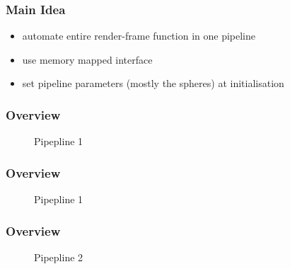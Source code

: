 \documentclass{beamer}
\begin{document}
\begin{frame} %
	\frametitle{Main Idea}
	\begin{itemize}
	\item automate entire render-frame function in one pipeline
	\item use memory mapped interface
	\item set pipeline parameters (mostly the spheres) at initialisation
	\end{itemize}
\end{frame}
\begin{frame} %
	\frametitle{Overview} %
		\begin{figure}[h]
		\centering
		\caption{Pipepline 1}
	\end{figure}
\end{frame}
\begin{frame} %
	\frametitle{Overview} %
	\begin{figure}[h]
		\centering
		\caption{Pipepline 1}
	\end{figure}
\end{frame}
\begin{frame} %
	\frametitle{Overview} %
	\begin{figure}[h]
		\centering
		\caption{Pipepline 2}
	\end{figure}
\end{frame}
\end{document}
